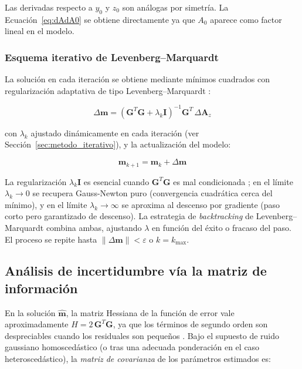 \documentclass[12pt, a4paper]{article}
\begin{document}
Las derivadas respecto a $y_0$ y $z_0$ son análogas por simetría.
La Ecuación~\eqref{eq:dAdA0} se obtiene directamente ya que $A_0$
aparece como factor lineal en el modelo.

\subsubsection*{Esquema iterativo de Levenberg--Marquardt}

La solución en cada iteración se obtiene mediante mínimos cuadrados
con regularización adaptativa de tipo Levenberg--Marquardt
\cite{levenberg1944method, marquardt1963algorithm}:

\begin{equation}
    \Delta\mathbf{m} = \left(\mathbf{G}^T\mathbf{G} +
    \lambda_k\mathbf{I}\right)^{-1} \mathbf{G}^T \,\Delta\mathbf{A}_z
    \label{eq:LM}
\end{equation}

con $\lambda_k$ ajustado dinámicamente en cada iteración (ver
Sección~\ref{sec:metodo_iterativo}), y la actualización del modelo:

\begin{equation}
    \mathbf{m}_{k+1} = \mathbf{m}_k + \Delta\mathbf{m}
    \label{eq:actualizacion}
\end{equation}

La regularización $\lambda_k\mathbf{I}$ es esencial cuando
$\mathbf{G}^T\mathbf{G}$ es mal condicionada \cite{tikhonov1963regularization};
en el límite $\lambda_k\to 0$ se recupera Gauss-Newton puro
(convergencia cuadrática cerca del mínimo), y en el límite
$\lambda_k\to\infty$ se aproxima al descenso por gradiente (paso
corto pero garantizado de descenso). La estrategia de
\emph{backtracking} de Levenberg--Marquardt combina ambas, ajustando
$\lambda$ en función del éxito o fracaso del paso. El proceso se
repite hasta $\|\Delta\mathbf{m}\| < \varepsilon$ o $k = k_{\max}$.

\subsection{Análisis de incertidumbre vía la matriz de información}
\label{sec:teoria_covarianza}

En la solución $\hat{\mathbf{m}}$, la matriz Hessiana de la función
de error vale aproximadamente $H = 2\,\mathbf{G}^T\mathbf{G}$, ya que
los términos de segundo orden son despreciables cuando los residuales
son pequeños \cite{nocedal2006numerical, bjorck1996numerical}. Bajo
el supuesto de ruido gaussiano homoscedástico (o tras una adecuada
ponderación en el caso heteroscedástico), la \emph{matriz de
covarianza} de los parámetros estimados es:
\end{document}
